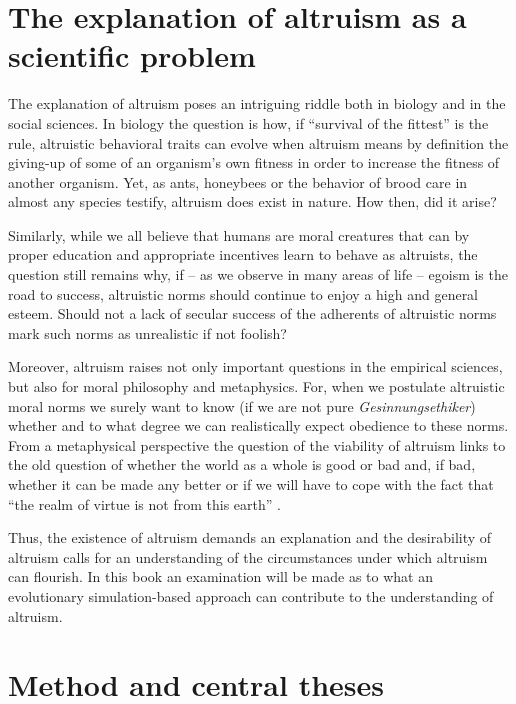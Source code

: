 \section{The explanation of altruism as a scientific problem}

The explanation of altruism poses an intriguing riddle both in biology and in
the social sciences. In biology the question is how, if ``survival of the
fittest'' is the rule, altruistic behavioral traits can evolve when altruism
means by definition the giving-up of some of an organism's own fitness in
order to increase the fitness of another organism. Yet, as ants, honeybees or
the behavior of brood care in almost any species testify, altruism does exist
in nature. How then, did it arise?

Similarly, while we all believe that humans are moral creatures that can by
proper education and appropriate incentives learn to behave as altruists, the
question still remains why, if -- as we observe in many areas of life --
egoism is the road to success, altruistic norms should continue to enjoy a
high and general esteem. Should not a lack of secular success of the adherents
of altruistic norms mark such norms as unrealistic if not foolish?

Moreover, altruism raises not only important questions in the empirical
sciences, but also for moral philosophy and metaphysics.  For, when we
postulate altruistic moral norms we surely want to know (if we are not pure
{\em Gesinnungsethiker}) whether and to what degree we can realistically
expect obedience to these norms. From a metaphysical perspective the question
of the viability of altruism links to the old question of whether the world as
a whole is good or bad and, if bad, whether it can be made any better or if we
will have to cope with the fact that ``the realm of virtue is not from this
earth'' \cite[]{schopenhauer:1831}.

Thus, the existence of altruism demands an explanation and the desirability of
altruism calls for an understanding of the circumstances under which altruism
can flourish. In this book an examination will be made as to what an
evolutionary simulation-based approach can contribute to the understanding of
altruism.

\section{Method and central theses}


